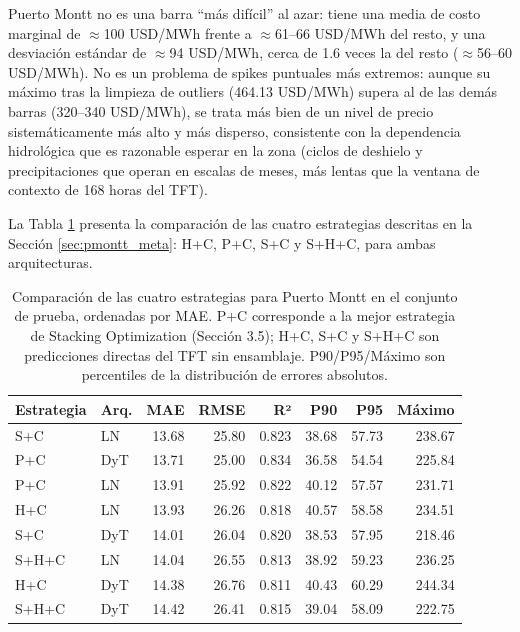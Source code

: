 Puerto Montt no es una barra ``más difícil'' al azar: tiene una media de costo marginal de $\approx$100 USD/MWh frente a $\approx$61--66 USD/MWh del resto, y una desviación estándar de $\approx$94 USD/MWh, cerca de 1.6 veces la del resto ($\approx$56--60 USD/MWh). No es un problema de spikes puntuales más extremos: aunque su máximo tras la limpieza de outliers (464.13 USD/MWh) supera al de las demás barras (320--340 USD/MWh), se trata más bien de un nivel de precio sistemáticamente más alto y más disperso, consistente con la dependencia hidrológica que es razonable esperar en la zona (ciclos de deshielo y precipitaciones que operan en escalas de meses, más lentas que la ventana de contexto de 168 horas del TFT).

La Tabla \ref{tab:pmontt_comparacion} presenta la comparación de las cuatro estrategias descritas en la Sección \ref{sec:pmontt_meta}: H+C, P+C, S+C y S+H+C, para ambas arquitecturas.

\begin{table}[htbp]
    \centering
    \begin{tabular}{llrrrrrr}
        \toprule
        Estrategia & Arq. & MAE & RMSE & R² & P90 & P95 & Máximo \\
        \midrule
        S+C   & LN  & 13.68 & 25.80 & 0.823 & 38.68 & 57.73 & 238.67 \\
        P+C   & DyT & 13.71 & 25.00 & 0.834 & 36.58 & 54.54 & 225.84 \\
        P+C   & LN  & 13.91 & 25.92 & 0.822 & 40.12 & 57.57 & 231.71 \\
        H+C   & LN  & 13.93 & 26.26 & 0.818 & 40.57 & 58.58 & 234.51 \\
        S+C   & DyT & 14.01 & 26.04 & 0.820 & 38.53 & 57.95 & 218.46 \\
        S+H+C & LN  & 14.04 & 26.55 & 0.813 & 38.92 & 59.23 & 236.25 \\
        H+C   & DyT & 14.38 & 26.76 & 0.811 & 40.43 & 60.29 & 244.34 \\
        S+H+C & DyT & 14.42 & 26.41 & 0.815 & 39.04 & 58.09 & 222.75 \\
        \bottomrule
    \end{tabular}
    \caption{Comparación de las cuatro estrategias para Puerto Montt en el conjunto de prueba, ordenadas por MAE. P+C corresponde a la mejor estrategia de Stacking Optimization (Sección 3.5); H+C, S+C y S+H+C son predicciones directas del TFT sin ensamblaje. P90/P95/Máximo son percentiles de la distribución de errores absolutos.}
    \label{tab:pmontt_comparacion}
\end{table}

